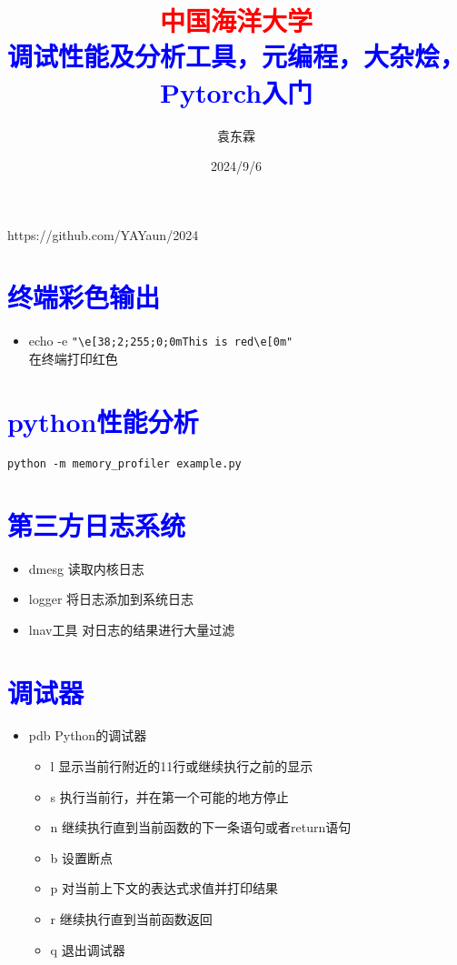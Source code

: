 \documentclass{article}
\begin{document}
  
\title{\textcolor{red}{中国海洋大学}\\\textcolor{blue}{调试性能及分析工具，元编程，大杂烩，Pytorch入门}}
\author{袁东霖}  
\date{2024/9/6}  
\maketitle  
https://github.com/YAYaun/2024 \\
\section{\textcolor{blue}{终端彩色输出}}
\begin{itemize}
    \item  echo -e \verb+"\e[38;2;255;0;0mThis is red\e[0m"+  
    \\在终端打印红色
\end{itemize}
\section{\textcolor{blue}{python性能分析}}
\begin{lstlisting}
python -m memory_profiler example.py
\end{lstlisting}
\section{\textcolor{blue}{第三方日志系统}}
    \begin{itemize}
        \item dmesg 读取内核日志
        \item logger 将日志添加到系统日志
        \item lnav工具 对日志的结果进行大量过滤
    \end{itemize}
\section{\textcolor{blue}{调试器}}
    \begin{itemize}
        \item pdb Python的调试器
            \begin{itemize}
                \item l     显示当前行附近的11行或继续执行之前的显示
                \item s     执行当前行，并在第一个可能的地方停止
                \item n     继续执行直到当前函数的下一条语句或者return语句  
                \item b     设置断点
                \item p     对当前上下文的表达式求值并打印结果
                \item r     继续执行直到当前函数返回
                \item q     退出调试器
            \end{itemize}
    \end{itemize}
\end{document}
